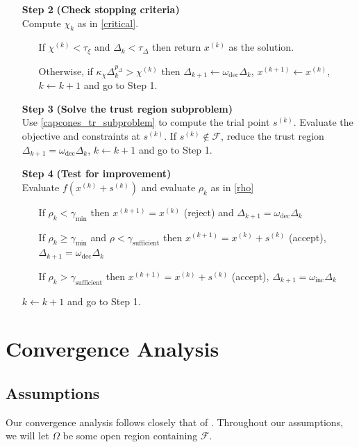 \documentclass{article}
\theoremstyle{case}
\newcommand{\xk}{{x^{(k)}}}
\newcommand{\xkpo}{{{x}^{(k+1)}}}
\newcommand{\dk}{\Delta_k}
\newcommand{\mfk}{{{m}_f}^{(k)}}
\newcommand{\sk}{{{s}^{(k)}}}
\newcommand{\feasible}{{\mathcal F}}
\newcommand{\chik}{{\chi^{(k)}}}
\newcommand{\omegainc}{\omega_{\text{inc}}}
\newcommand{\omegadec}{\omega_{\text{dec}}}
\newcommand{\gammasm}{\gamma_{\text{min}}}
\newcommand{\gammabi}{\gamma_{\text{sufficient}}}
\begin{document}
\begin{algorithm}[H]
\begin{itemize}
        \item[\textbf{Step 2}] \textbf{(Check stopping criteria)} \\
            Compute $\chi_k$ as in \cref{critical}. \begin{itemize}
                \item[] If $ \chik < \tau_{\xi} $ and $\dk <\tau_{\Delta}$ then return $\xk$ as the solution.
                \item[] Otherwise, if $\kappa_{\chi} \dk^{p_{\Delta}} > \chik$ then 
                $\Delta_{k+1} \gets \omegadec\dk$, 
                $x^{(k+1)} \gets \xk$,
                $k \gets k+1$ and go to Step 1.
            \end{itemize}
        
        \item[\textbf{Step 3}] \textbf{(Solve the trust region subproblem)} \\
        	Use \cref{capcones_tr_subproblem} to compute the trial point $\sk$.
        	Evaluate the objective and constraints at $\sk$.
        	If $\sk \not \in \feasible$, reduce the trust region $\Delta_{k+1} = \omegadec\dk$, $k \gets k+1$ and go to Step 1.
            
        \item[\textbf{Step 4}] \textbf{(Test for improvement)} \\
            Evaluate $f(\xk + \sk)$ and evaluate $\rho_k$ as in \cref{rho} \begin{itemize}
                \item[] If $\rho_k < \gammasm$ then $\xkpo=\xk$ (reject) and $\Delta_{k+1} = \omegadec\dk$
                \item[] If $\rho_k \ge \gammasm$ and $\rho < \gammabi$ then $\xkpo=\xk+\sk$ (accept), $\Delta_{k+1} = \omegadec\dk$
                \item[] If $\rho_k > \gammabi$ then $\xkpo=\xk+\sk$ (accept), $\Delta_{k+1} = \omegainc\dk$
            \end{itemize}
            $k \gets k+1$ and go to Step 1.
    \end{itemize}
\end{algorithm}

\section{Convergence Analysis}

\subsection{Assumptions}
Our convergence analysis follows closely that of \cite{Conejo:2013:GCT:2620806.2621814}.
Throughout our assumptions, we will let $\Omega$ be some open region containing $\feasible$.
\end{document}
